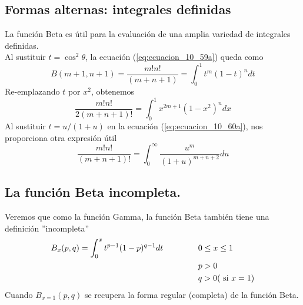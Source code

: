 \subsection{Formas alternas: integrales definidas}
La función Beta es útil para la evaluación de una amplia variedad de integrales definidas.\\
Al sustituir $t= \cos^{2} \theta$, la ecuación (\ref{eq:ecuacion_10_59a}) queda como
\begin{equation}
B(m+1,n+1) = \dfrac{m! n!}{(m+n+1)} = \int_{0}^{1} t^{m} (1-t)^{n} dt
\label{eq:ecuacion_10_60a}
\end{equation}
Re-emplazando $t$ por $x^{2}$, obtenemos
\begin{equation}
\dfrac{m! n!}{2(m+n+1)!} = \int_{0}^{1} x^{2m+1} (1-x^{2})^{n} dx
\label{eq:ecuacion_10_60a}
\end{equation}
Al sustituir $t= u/(1+u)$ en la ecuación (\ref{eq:ecuacion_10_60a}), nos proporciona otra expresión útil
\begin{equation}
\dfrac{m! n!}{(m+n+1)!} = \int_{0}^{\infty} \dfrac{u^{m}}{(1+u)^{m+n+2}} du
\label{eq:ecuacion_10_61}
\end{equation}
\subsection{La función Beta incompleta.}
Veremos que como la función Gamma, la función Beta también tiene una definición ''incompleta''
\begin{eqnarray}
\begin{aligned}
B_{x}(p,q) = \int_{0}^{x} t^{p-1} (1-p)^{q-1} dt \hspace{1.5cm} & 0 \leq x \leq 1 \\
& p > 0 \\
& q > 0 (\text{ si } x=1)
\label{eq:ecuacion_10_67}
\end{aligned}
\end{eqnarray}
Cuando $B_{x=1}(p,q)$ se recupera la forma regular (completa) de la función Beta.
